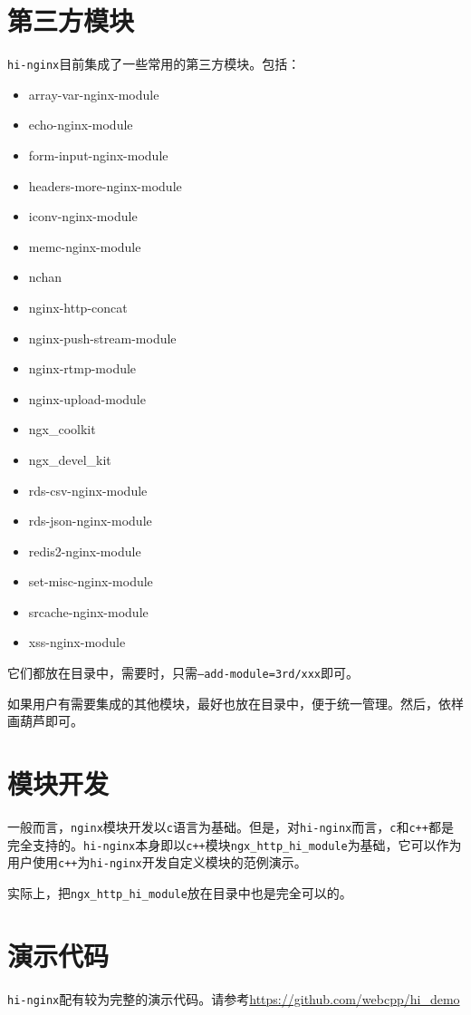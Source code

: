 \section{第三方模块}
\texttt{hi-nginx}目前集成了一些常用的第三方模块。包括：
\begin{itemize}
\item array-var-nginx-module
\item echo-nginx-module
\item form-input-nginx-module
\item headers-more-nginx-module
\item iconv-nginx-module
\item memc-nginx-module
\item nchan
\item nginx-http-concat
\item nginx-push-stream-module
\item nginx-rtmp-module
\item nginx-upload-module
\item ngx_coolkit
\item ngx_devel_kit
\item rds-csv-nginx-module
\item rds-json-nginx-module
\item redis2-nginx-module
\item set-misc-nginx-module
\item srcache-nginx-module
\item xss-nginx-module
\end{itemize}
它们都放在目录中，需要时，只需\texttt{--add-module=3rd/xxx}即可。

如果用户有需要集成的其他模块，最好也放在目录中，便于统一管理。然后，依样画葫芦即可。

\section{模块开发}
一般而言，\texttt{nginx}模块开发以\texttt{c}语言为基础。但是，对\texttt{hi-nginx}而言，\texttt{c}和\texttt{c++}都是完全支持的。\texttt{hi-nginx}本身即以\texttt{c++}模块\texttt{ngx_http_hi_module}为基础，它可以作为用户使用\texttt{c++}为\texttt{hi-nginx}开发自定义模块的范例演示。

实际上，把\texttt{ngx_http_hi_module}放在目录中也是完全可以的。

\section{演示代码}
\texttt{hi-nginx}配有较为完整的演示代码。请参考\url{https://github.com/webcpp/hi_demo}



